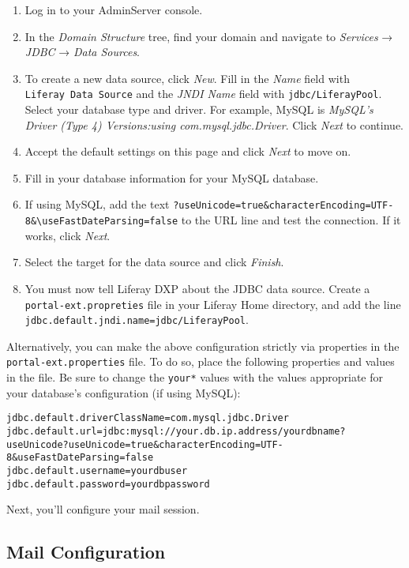 \begin{enumerate}
\def\labelenumi{\arabic{enumi}.}
\item
  Log in to your AdminServer console.
\item
  In the \emph{Domain Structure} tree, find your domain and navigate to
  \emph{Services} → \emph{JDBC} → \emph{Data Sources}.
\item
  To create a new data source, click \emph{New}. Fill in the \emph{Name}
  field with \texttt{Liferay\ Data\ Source} and the \emph{JNDI Name}
  field with \texttt{jdbc/LiferayPool}. Select your database type and
  driver. For example, MySQL is \emph{MySQL's Driver (Type 4)
  Versions:using com.mysql.jdbc.Driver}. Click \emph{Next} to continue.
\item
  Accept the default settings on this page and click \emph{Next} to move
  on.
\item
  Fill in your database information for your MySQL database.
\item
  If using MySQL, add the text
  \texttt{?useUnicode=true\&characterEncoding=UTF-8\&\textbackslash{}useFastDateParsing=false}
  to the URL line and test the connection. If it works, click
  \emph{Next}.
\item
  Select the target for the data source and click \emph{Finish}.
\item
  You must now tell Liferay DXP about the JDBC data source. Create a
  \texttt{portal-ext.propreties} file in your Liferay Home directory,
  and add the line \texttt{jdbc.default.jndi.name=jdbc/LiferayPool}.
\end{enumerate}

Alternatively, you can make the above configuration strictly via
properties in the \texttt{portal-ext.properties} file. To do so, place
the following properties and values in the file. Be sure to change the
\texttt{your*} values with the values appropriate for your database's
configuration (if using MySQL):

\begin{verbatim}
jdbc.default.driverClassName=com.mysql.jdbc.Driver
jdbc.default.url=jdbc:mysql://your.db.ip.address/yourdbname?useUnicode?useUnicode=true&characterEncoding=UTF-8&useFastDateParsing=false
jdbc.default.username=yourdbuser
jdbc.default.password=yourdbpassword
\end{verbatim}

Next, you'll configure your mail session.

\subsection{Mail Configuration}\label{mail-configuration-4}

